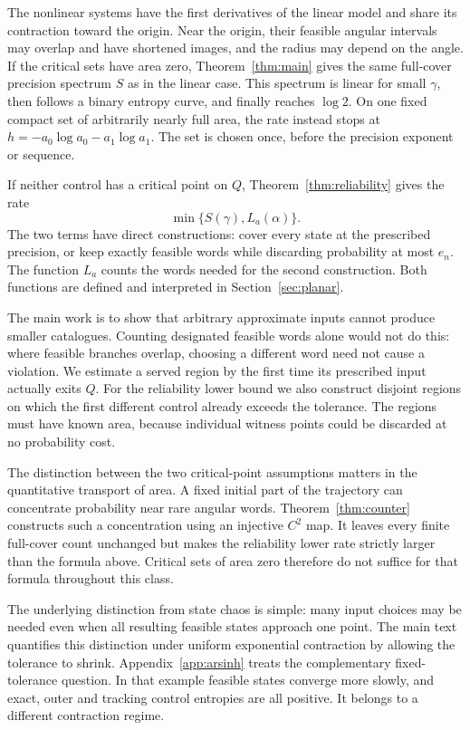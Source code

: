 \documentclass[11pt]{amsart}
\theoremstyle{definition}
\theoremstyle{remark}
\numberwithin{equation}{section}
\begin{document}
The nonlinear systems have the first derivatives of the linear
model and share its contraction toward the origin. Near the origin, their feasible angular intervals may overlap and
have shortened images, and the radius may depend on the angle.
If the critical sets have area zero, Theorem~\ref{thm:main} gives
the same full-cover precision spectrum $S$ as in the linear case. This spectrum is linear for
small $\gamma$, then follows a binary entropy curve, and finally
reaches $\log2$. On one fixed compact set of arbitrarily nearly
full area, the rate instead stops at
$h=-a_0\log a_0-a_1\log a_1$. The set is chosen once, before
the precision exponent or sequence.

If neither control has a critical point on $Q$,
Theorem~\ref{thm:reliability} gives the rate
\[
\min\{S(\gamma),L_a(\alpha)\}.
\]
The two terms have direct
constructions: cover every state at the prescribed precision, or
keep exactly feasible words while discarding probability at most
$e_n$. The function $L_a$ counts the words needed for the second
construction. Both functions are defined and interpreted in
Section~\ref{sec:planar}.

The main work is to show that arbitrary approximate inputs cannot
produce smaller catalogues. Counting designated feasible words
alone would not do this: where feasible branches overlap, choosing
a different word need not cause a violation. We estimate a served
region by the first time its prescribed input actually exits $Q$.
For the reliability lower bound we also construct disjoint regions
on which the first different control already exceeds the tolerance.
The regions must have known area, because individual witness points
could be discarded at no probability cost.

The distinction between the two critical-point assumptions matters
in the quantitative transport of area. A fixed initial
part of the trajectory can concentrate probability near rare
angular words. Theorem~\ref{thm:counter} constructs such a
concentration using an injective $C^2$ map. It leaves every finite
full-cover count unchanged but makes the reliability lower rate
strictly larger than the formula above. Critical sets of area zero
therefore do not suffice for that formula throughout this class.

The underlying distinction from state chaos is simple: many input
choices may be needed even when all resulting feasible states
approach one point. The main text quantifies this distinction under
uniform exponential contraction by allowing the tolerance to
shrink. Appendix~\ref{app:arsinh} treats the complementary
fixed-tolerance question. In that example feasible states converge
more slowly, and exact, outer and tracking control entropies are
all positive. It belongs to a different contraction regime.
\end{document}
